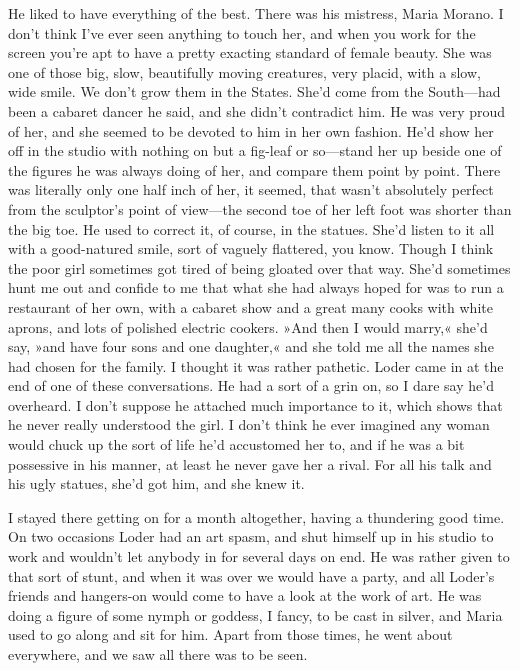 He liked to have everything of the best. There was his mistress, Maria Morano. I don't think I've ever seen anything to touch her, and when you work for the screen you're apt to have a pretty exacting standard of female beauty. She was one of those big, slow, beautifully moving creatures, very placid, with a slow, wide smile. We don't grow them in the States. She'd come from the South—had been a cabaret dancer he said, and she didn't contradict him. He was very proud of her, and she seemed to be devoted to him in her own fashion. He'd show her off in the studio with nothing on but a fig-leaf or so—stand her up beside one of the figures he was always doing of her, and compare them point by point. There was literally only one half inch of her, it seemed, that wasn't absolutely perfect from the sculptor's point of view—the second toe of her left foot was shorter than the big toe. He used to correct it, of course, in the statues. She'd listen to it all with a good-natured smile, sort of vaguely flattered, you know. Though I think the poor girl sometimes got tired of being gloated over that way. She'd sometimes hunt me out and confide to me that what she had always hoped for was to run a restaurant of her own, with a cabaret show and a great many cooks with white aprons, and lots of polished electric cookers. »And then I would marry,« she'd say, »and have four sons and one daughter,« and she told me all the names she had chosen for the family. I thought it was rather pathetic. Loder came in at the end of one of these conversations. He had a sort of a grin on, so I dare say he'd overheard. I don't suppose he attached much importance to it, which shows that he never really understood the girl. I don't think he ever imagined any woman would chuck up the sort of life he'd accustomed her to, and if he was a bit possessive in his manner, at least he never gave her a rival. For all his talk and his ugly statues, she'd got him, and she knew it.

I stayed there getting on for a month altogether, having a thundering good time. On two occasions Loder had an art spasm, and shut himself up in his studio to work and wouldn't let anybody in for several days on end. He was rather given to that sort of stunt, and when it was over we would have a party, and all Loder's friends and hangers-on would come to have a look at the work of art. He was doing a figure of some nymph or goddess, I fancy, to be cast in silver, and Maria used to go along and sit for him. Apart from those times, he went about everywhere, and we saw all there was to be seen.

